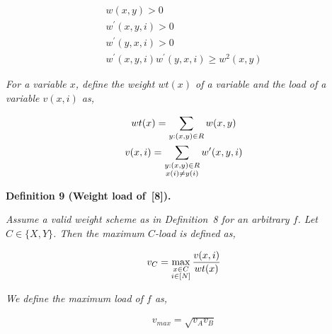 \[\begin{gathered}
\displaystyle w(x,y)>0 \\
\displaystyle w^{\prime}(x,y,i)>0 \\
\displaystyle w^{\prime}(y,x,i)>0 \\
\displaystyle w^{\prime}(x,y,i)w^{\prime}(y,x,i)\geq w^{2}(x,y)
\end{gathered}\]


\emph{For a variable $x$, define the weight $wt(x)$ of a variable and the load of a variable $v(x,i)$ as,}\par


\[\begin{gathered}
\displaystyle wt(x) \displaystyle=\sum_{y:(x,y)\in R}w(x,y) \\
\displaystyle v(x,i) \displaystyle=\sum_{\begin{subarray}{c}y:(x,y)\in R\\
x(i)\neq y(i)\end{subarray}}w^{\prime}(x,y,i)
\end{gathered}\]







\par\medskip\noindent\textbf{
\textbf{Definition 9}\textbf{ }(Weight load of [8])\textbf{.}
}\par



\emph{Assume a valid weight scheme as in Definition 8 for an arbitrary $f$. Let $C\in\{X,Y\}$. Then the maximum $C$-load is defined as,}\par


\[\begin{gathered}
\displaystyle v_{C}=\max_{\begin{subarray}{c}x\in C\\
i\in[N]\end{subarray}}\frac{v(x,i)}{wt(x)}
\end{gathered}\]


\emph{We define the maximum load of $f$ as,}\par


\[\begin{gathered}
\displaystyle v_{max}=\sqrt{v_{A}v_{B}}
\end{gathered}\]






